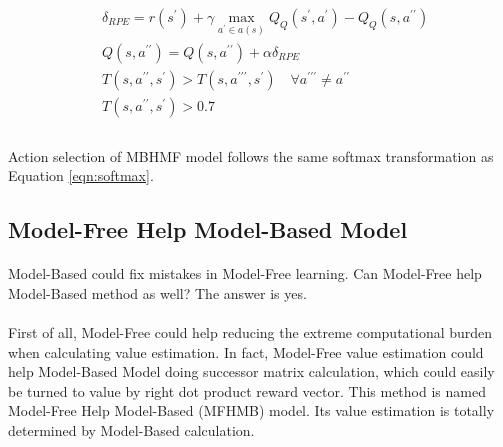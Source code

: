 \begin{equation}
\begin{aligned}
&\delta_{RPE}=r(s^{\prime})+\gamma \max_{a^{\prime} \in a(s)}{Q_{Q}(s^{\prime}, a^{\prime})}- Q_{Q}(s,a^{\prime \prime}) \\
&Q(s,a^{\prime \prime})=Q(s,a^{\prime \prime})+\alpha \delta_{RPE} \\
&T(s,a^{\prime \prime},s^{\prime}) > T(s,a^{\prime \prime \prime},s^{\prime}) \quad \forall a^{\prime \prime \prime}\neq a^{\prime \prime} \\
&T(s,a^{\prime \prime},s^{\prime}) > 0.7 \\
\end{aligned}
\label{eqn:MB help MF Q-Learning}
\end{equation}

\paragraph{}
Action selection of MBHMF model follows the same softmax transformation as Equation \ref{eqn:softmax}. 

\subsection{Model-Free Help Model-Based Model}
\label{sec:Model-Free Help Model-Based Model}
\paragraph{}
Model-Based could fix mistakes in Model-Free learning. Can Model-Free help Model-Based method as well? The answer is yes. 
\paragraph{}
First of all, Model-Free could help reducing the extreme computational burden when calculating value estimation. In fact, Model-Free value estimation could help Model-Based Model doing successor matrix calculation, which could easily be turned to value by right dot product reward vector. This method is named Model-Free Help Model-Based (MFHMB) model. Its value estimation is totally determined by Model-Based calculation. 
